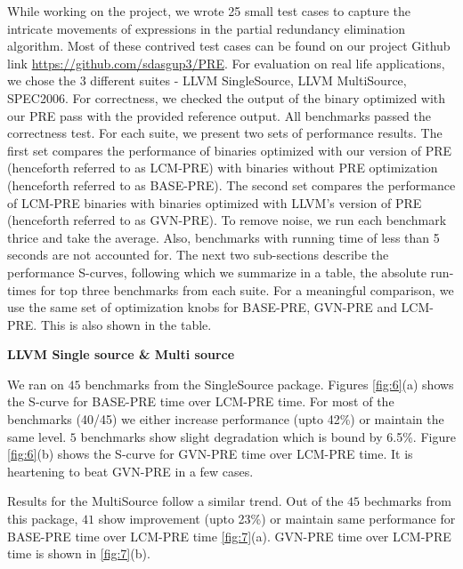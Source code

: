 \documentclass[10pt,twoside]{report}
\begin{document}
While working on the project, we wrote 25 small test cases to capture the intricate movements
of expressions in the partial redundancy elimination algorithm. Most of these contrived test cases can 
be found on our project Github link \url{https://github.com/sdasgup3/PRE}. For evaluation on real life applications, we
chose the 3 different suites - LLVM SingleSource, LLVM MultiSource, SPEC2006. For correctness, we checked the 
output of the binary optimized with our PRE pass with the provided reference output. All benchmarks passed the 
correctness test. For each suite, we present two sets of performance results. The first set compares the performance
of binaries optimized with our version of PRE (henceforth referred to as LCM-PRE) with binaries without PRE
optimization (henceforth referred to as BASE-PRE). The second set compares the
performance of LCM-PRE binaries with binaries optimized with LLVM's version of
PRE (henceforth referred to as GVN-PRE). To remove noise, we run each benchmark
thrice and take the average. Also, benchmarks with running time of less than 5
seconds are not accounted for. The next two sub-sections describe the
performance S-curves, following which we summarize in a table, the absolute
run-times for top three benchmarks from each suite. For a meaningful comparison,
we use the same set of optimization knobs for BASE-PRE, GVN-PRE and LCM-PRE.
This is also shown in the table. 

\begin{flushleft}
\textbf{\normalsize{LLVM Single source \& Multi source}}
\end{flushleft}

We ran on $45$ benchmarks from the SingleSource package. Figures \ref{fig:6}(a)
shows the S-curve for BASE-PRE time over LCM-PRE time. For most of the
benchmarks (40/45) we either increase performance (upto 42\%) or maintain the
same level. $5$ benchmarks show slight degradation which is bound by 6.5\%.
Figure \ref{fig:6}(b) shows the S-curve for GVN-PRE time over LCM-PRE time. It is
heartening to beat GVN-PRE in a few cases. 

Results for the MultiSource follow a similar trend. Out of the $45$ bechmarks
from this package, $41$ show improvement (upto 23\%) or maintain same
performance for BASE-PRE time over LCM-PRE time \ref{fig:7}(a).
GVN-PRE time over LCM-PRE time is shown in \ref{fig:7}(b).
\end{document}
